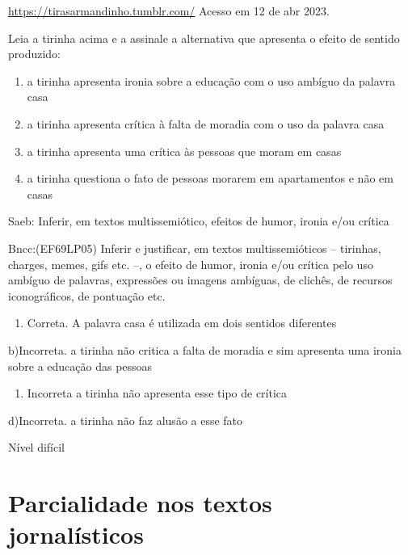 {\href{https://tirasarmandinho.tumblr.com/}{\uline{https://tirasarmandinho.tumblr.com/}}
Acesso em 12 de abr 2023.

Leia a tirinha acima e a assinale a alternativa que apresenta o efeito
de sentido produzido:

\begin{enumerate}
\def\labelenumi{\alph{enumi})}
\item
  a tirinha apresenta ironia sobre a educação com o uso ambíguo da
  palavra casa
\item
  a tirinha apresenta crítica à falta de moradia com o uso da palavra
  casa
\item
  a tirinha apresenta uma crítica às pessoas que moram em casas
\item
  a tirinha questiona o fato de pessoas morarem em apartamentos e não em
  casas
\end{enumerate}

Saeb: Inferir, em textos multissemiótico, efeitos de humor, ironia e/ou
crítica

Bncc:(EF69LP05) Inferir e justificar, em textos multissemióticos --
tirinhas, charges, memes, gifs etc. --, o efeito de humor, ironia e/ou
crítica pelo uso ambíguo de palavras, expressões ou imagens ambíguas, de
clichês, de recursos iconográficos, de pontuação etc.

\begin{enumerate}
\def\labelenumi{\arabic{enumi}.}
\tightlist
\item
  Correta. A palavra casa é utilizada em dois sentidos diferentes
\end{enumerate}

b)Incorreta. a tirinha não critica a falta de moradia e sim apresenta
uma ironia sobre a educação das pessoas

\begin{enumerate}
\def\labelenumi{\arabic{enumi}.}
\tightlist
\item
  Incorreta a tirinha não apresenta esse tipo de crítica
\end{enumerate}

d)Incorreta. a tirinha não faz alusão a esse fato

Nível difícil


\chapter{Parcialidade nos textos jornalísticos}


}
